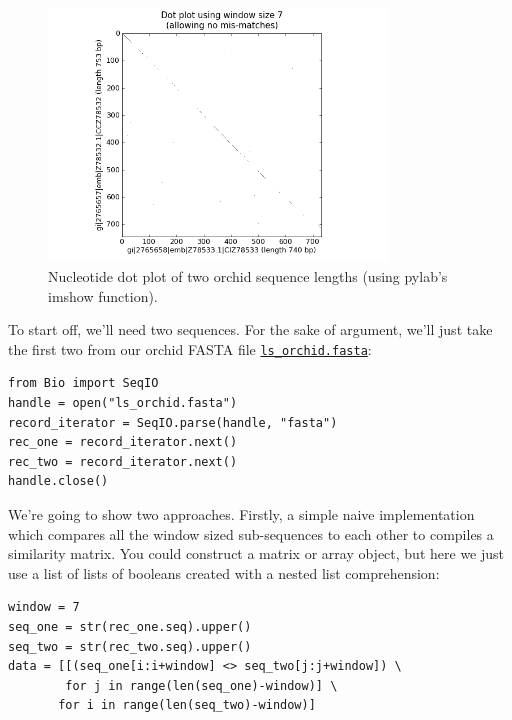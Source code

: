 \documentclass{report}
\begin{document}
%
%
\begin{latexonly}
\begin{figure}[htbp]
\centering
\includegraphics[width=0.8\textwidth]{images/dot_plot.png}
\caption{Nucleotide dot plot of two orchid sequence lengths (using pylab's imshow function).}
\label{fig:nuc-dot-plot}
\end{figure}
\end{latexonly}

To start off, we'll need two sequences.  For the sake of argument, we'll just take
the first two from our orchid FASTA file \href{http://biopython.org/DIST/docs/tutorial/examples/ls_orchid.fasta}{\tt ls\_orchid.fasta}:

\begin{verbatim}
from Bio import SeqIO
handle = open("ls_orchid.fasta")
record_iterator = SeqIO.parse(handle, "fasta")
rec_one = record_iterator.next()
rec_two = record_iterator.next()
handle.close()
\end{verbatim}

We're going to show two approaches.  Firstly, a simple naive implementation
which compares all the window sized sub-sequences to each other to compiles a
similarity matrix.  You could construct a matrix or array object, but here we
just use a list of lists of booleans created with a nested list
comprehension:

\begin{verbatim}
window = 7
seq_one = str(rec_one.seq).upper()
seq_two = str(rec_two.seq).upper()
data = [[(seq_one[i:i+window] <> seq_two[j:j+window]) \
        for j in range(len(seq_one)-window)] \
       for i in range(len(seq_two)-window)]
\end{verbatim}
\end{document}
